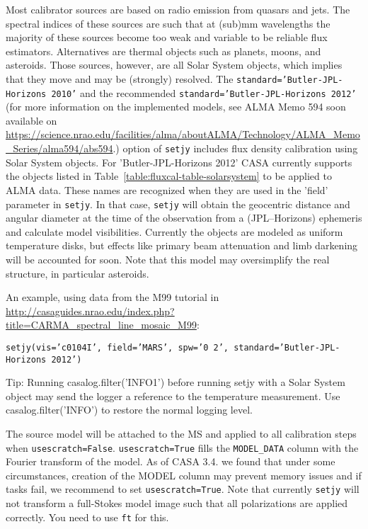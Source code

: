 Most calibrator sources are based on radio emission from quasars and
jets. The spectral indices of these sources are such that at (sub)mm
wavelengths the majority of these sources become too weak and variable
to be reliable flux estimators. Alternatives are thermal objects such
as planets, moons, and asteroids. Those sources, however, are all
Solar System objects, which implies that they move and may be
(strongly) resolved. The {\tt standard='Butler-JPL-Horizons 2010'} and
the recommended {\tt standard='Butler-JPL-Horizons 2012'} (for more
information on the implemented models, see ALMA Memo 594 soon
available on
\url{https://science.nrao.edu/facilities/alma/aboutALMA/Technology/ALMA_Memo_Series/alma594/abs594}.)
option of {\tt setjy} includes flux density calibration using Solar
System objects. For 'Butler-JPL-Horizons 2012' CASA currently supports
the objects listed in Table~\ref{table:fluxcal-table-solarsystem} to
be applied to ALMA data. These names are recognized when they are used
in the 'field' parameter in {\tt setjy}.  In that case, {\tt setjy}
will obtain the geocentric distance and angular diameter at the time
of the observation from a (JPL--Horizons) ephemeris and calculate
model visibilities.  Currently the objects are modeled as uniform
temperature disks, but effects like primary beam attenuation and limb
darkening will be accounted for soon. Note that this model may
oversimplify the real structure, in particular asteroids.

An example, using data from the M99 tutorial in 
\url{http://casaguides.nrao.edu/index.php?title=CARMA_spectral_line_mosaic_M99}:

{\tt setjy(vis='c0104I', field='MARS', spw='0~2', standard='Butler-JPL-Horizons 2012')}

Tip: Running casalog.filter('INFO1') before running setjy with a Solar
System object may send the logger a reference to the temperature
measurement.  Use casalog.filter('INFO') to restore the normal logging
level.

The source model will be attached to the MS and applied to all
calibration steps when {\tt usescratch=False}. {\tt usescratch=True}
  fills the {\tt MODEL\_DATA} column with the Fourier transform of the
  model. As of CASA 3.4. we found that under some circumstances,
  creation of the MODEL column may prevent memory issues and if tasks
  fail, we recommend to set {\tt usescratch=True}. Note that currently
  {\tt setjy} will not transform a full-Stokes model image such that
  all polarizations are applied correctly.  You need to use {\tt ft}
  for this.


